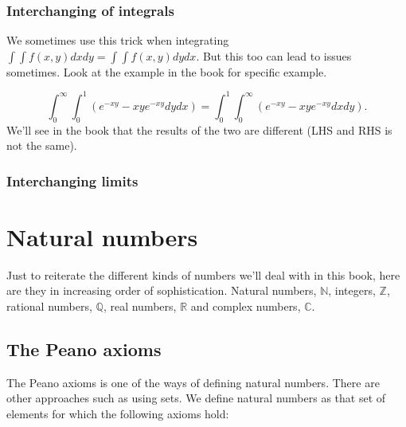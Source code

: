 \documentclass{report}
\begin{document}
\subsection{}
\subsection{}
\subsection{Interchanging of integrals}
We sometimes use this trick when integrating $\int \int f(x,y) dx dy = \int \int f(x,y) dy dx$. But this too can lead to issues sometimes. Look at the example in the book for specific example. 

\[
	\int_{0}^{\infty} \int_{0}^{1} \left( e^{-xy}-xye^{-xy}dy dx \right) = \int_{0}^{1} \int_{0}^{\infty} \left( e^{-xy}-xye^{-xy}dxdy \right)      
.\] 
We'll see in the book that the results of the two are different (LHS and RHS is not the same).

\subsection{Interchanging limits}
\subsection{}
\subsection{}


\chapter{Natural numbers}
Just to reiterate the different kinds of numbers we'll deal with in this book, here are they in increasing order of sophistication. Natural numbers, $\mathbb{N}$,  integers, $\mathbb{Z}$, rational numbers, $\mathbb{Q}$, real numbers, $\mathbb{R}$ and complex numbers, $\mathbb{C}$. 

\section{The Peano axioms}
The Peano axioms is one of the ways of defining natural numbers. There are other approaches such as using sets.
We define natural numbers as that set of elements for which the following axioms hold:
\end{document}
